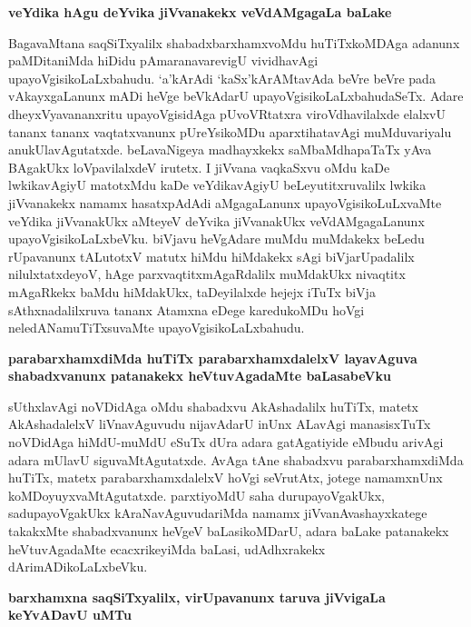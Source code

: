 {\bigskip
\noindent
{\large\bf veYdika hAgu deYvika jiVvanakekx veVdAMgagaLa baLake}}\label{page191a}
\medskip

\noindent
BagavaMtana saqSiTxyalilx shabadxbarxhamxvoMdu huTiTxkoMDAga adanunx paMDitaniMda hiDidu pAmaranavarevigU vividhavAgi upayoVgisikoLaLxbahudu. `a'kArAdi `kaSx'kArAMtavAda beVre beVre pada vAkayxgaLanunx mADi heVge beVkAdarU upayoVgisikoLaLxbahudaSeTx. Adare dheyxVyavananxritu upayoVgisidAga pUvoVRtatxra viroVdhavilalxde elalxvU tananx tananx vaqtatxvanunx pUreYsikoMDu aparxtihatavAgi muMduvariyalu anukUlavAgutatxde. beLavaNigeya madhayxkekx saMbaMdhapaTaTx yAva BAgakUkx loVpavilalxdeV irutetx. I jiVvana vaqkaSxvu oMdu kaDe lwkikavAgiyU matotxMdu kaDe veYdikavAgiyU beLeyutitxruvalilx lwkika jiVvanakekx namamx hasatxpAdAdi aMgagaLanunx upayoVgisikoLuLxvaMte veYdika jiVvanakUkx aMteyeV deYvika jiVvanakUkx veVdAMgagaLanunx upayoVgisikoLaLxbeVku. biVjavu heVgAdare muMdu muMdakekx beLedu rUpavanunx tALutotxV matutx hiMdu hiMdakekx sAgi biVjarUpadalilx nilulxtatxdeyoV, hAge parxvaqtitxmAgaRdalilx muMdakUkx nivaqtitx mAgaRkekx baMdu hiMdakUkx, taDeyilalxde hejejx iTuTx biVja sAthxnadalilxruva tananx Atamxna eDege karedukoMDu hoVgi neledANamuTiTxsuvaMte upayoVgisikoLaLxbahudu.

{\bigskip
\noindent
{\large\bf parabarxhamxdiMda huTiTx parabarxhamxdalelxV layavAguva shabadxvanunx patanakekx heVtuvAgadaMte baLasabeVku}}\label{page192}
\medskip

\noindent
sUthxlavAgi noVDidAga oMdu shabadxvu AkAshadalilx huTiTx, matetx AkAshadalelxV liVnavAguvudu nijavAdarU inUnx ALavAgi manasisxTuTx noVDidAga hiMdU-muMdU eSuTx dUra adara gatAgatiyide eMbudu arivAgi adara mUlavU siguvaMtAgutatxde. AvAga tAne shabadxvu parabarxhamxdiMda huTiTx, matetx parabarxhamxdalelxV hoVgi seVrutAtx, jotege namamxnUnx koMDoyuyxvaMtAgutatxde. parxtiyoMdU saha durupayoVgakUkx, sadupayoVgakUkx kAraNavAguvudariMda namamx jiVvanAvashayxkatege takakxMte shabadxvanunx heVgeV baLasikoMDarU, adara baLake patanakekx heVtuvAgadaMte ecacxrikeyiMda baLasi, udAdhxrakekx dArimADikoLaLxbeVku.

{\medskip
\noindent
{\large\bf barxhamxna saqSiTxyalilx, virUpavanunx taruva jiVvigaLa keYvADavU uMTu}}\label{page192a}
\medskip

